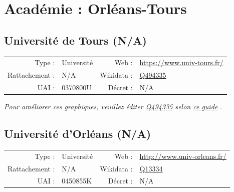 \documentclass[11pt,french,landscape]{article}
\begin{document}
\newpage

\hypertarget{acaduxe9mie-orluxe9ans-tours}{%
\section{Académie : Orléans-Tours}\label{acaduxe9mie-orluxe9ans-tours}}

\hypertarget{universituxe9-de-tours-na}{%
\subsection{Université de Tours (N/A)}\label{universituxe9-de-tours-na}}

\begin{tabular*}{0.45\textwidth}{rp{2cm}rl}  
\hline  
Type : & Université & Web : &\href{https://www.univ-tours.fr/}{https://www.univ-tours.fr/} \\  
Rattachement : & N/A & Wikidata : & \href{https://www.wikidata.org/entity/Q494335}{Q494335} \\  
UAI : & 0370800U & Décret : & N/A \\  
\hline  
\end{tabular*}

\textit{\scriptsize Pour améliorer ces graphiques, veuillez éditer \href{https://www.wikidata.org/entity/Q494335}{Q494335}  selon \href{https://github.com/cpesr/wikidataESR/blob/master/Rmd/wikidataESR.md}{ce guide}}
.


\newpage

\hypertarget{universituxe9-dorluxe9ans-na}{%
\subsection{Université d'Orléans
(N/A)}\label{universituxe9-dorluxe9ans-na}}

\begin{tabular*}{0.45\textwidth}{rp{2cm}rl}  
\hline  
Type : & Université & Web : &\href{http://www.univ-orleans.fr/}{http://www.univ-orleans.fr/} \\  
Rattachement : & N/A & Wikidata : & \href{https://www.wikidata.org/entity/Q13334}{Q13334} \\  
UAI : & 0450855K & Décret : & N/A \\  
\hline  
\end{tabular*}
\end{document}
